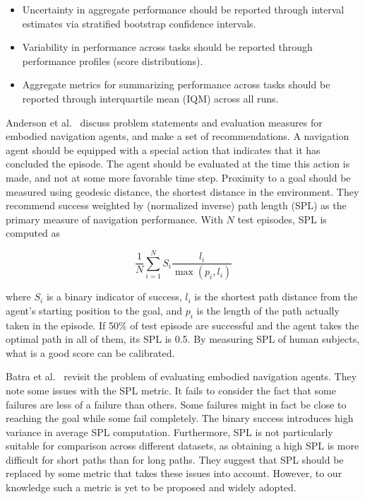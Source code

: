 \begin{itemize}
    \item Uncertainty in aggregate performance should be reported through interval estimates via stratified bootstrap confidence intervals.
    \item Variability in performance across tasks should be reported through performance profiles (score distributions).
    \item Aggregate metrics for summarizing performance across tasks should be reported through interquartile mean (IQM) across all runs.
\end{itemize}

Anderson et al.~\cite{anderson_evaluation_2018} discuss problem statements and evaluation measures for embodied navigation agents, and make a set of recommendations.
A navigation agent should be equipped with a special action that indicates that it has concluded the episode.
The agent should be evaluated at the time this action is made, and not at some more favorable time step. %
Proximity to a goal should be measured using geodesic distance, the shortest distance in the environment. %
They recommend success weighted by (normalized inverse) path length (SPL) as the primary measure of navigation performance.
With \(N\) test episodes, SPL is computed as 

\begin{equation}
    \frac{1}{N} \sum_{i=1}^N S_i \frac{l_i}{\max(p_i, l_i)}
\end{equation}

where \(S_i\) is a binary indicator of success,
\(l_i\) is the shortest path distance from the agent's starting position to the goal,
and \(p_i\) is the length of the path actually taken in the episode.
If 50\% of test episode are successful and the agent takes the optimal path in all of them, its SPL is 0.5.
By measuring SPL of human subjects, what is a good score can be calibrated.

Batra et al.~\cite{batra_evaluation_2020} revisit the problem of evaluating embodied navigation agents.
They note some issues with the SPL metric.
It fails to consider the fact that some failures are less of a failure than others.
Some failures might in fact be close to reaching the goal while some fail completely.
The binary success introduces high variance in average SPL computation.
Furthermore, SPL is not particularly suitable for comparison across different datasets,
as obtaining a high SPL is more difficult for short paths than for long paths.
They suggest that SPL should be replaced by some metric that takes these issues into account.
However, to our knowledge such a metric is yet to be proposed and widely adopted.
